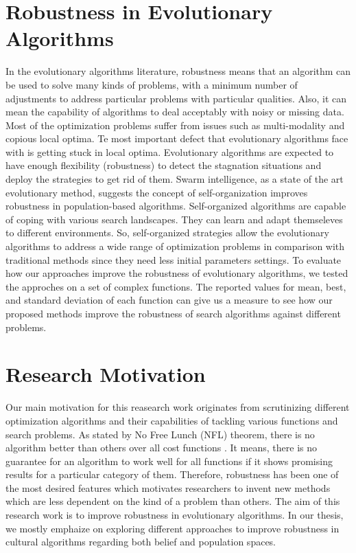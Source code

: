 \section{Robustness in Evolutionary Algorithms}
In the evolutionary algorithms literature, robustness means that an algorithm can be used to solve many kinds of problems, with a minimum number of adjustments to address particular problems with particular qualities. Also, it can mean the capability of algorithms to deal acceptably with noisy or missing data. Most of the optimization problems suffer from issues such as multi-modality and copious local optima. Te most important defect that evolutionary algorithms face with is getting stuck in local optima. Evolutionary algorithms are expected to have enough flexibility (robustness) to detect the stagnation situations and deploy the strategies to get rid of them.\newline
Swarm intelligence, as a state of the art evolutionary method, suggests the concept of self-organization improves robustness in population-based algorithms. Self-organized algorithms are capable of coping with various search landscapes. They can learn and adapt themseleves to different environments. So, self-organized strategies allow the evolutionary algorithms to address a wide range of optimization problems in comparison with traditional methods since they need less initial parameters settings. \newline
To evaluate how our approaches improve the robustness of evolutionary algorithms, we tested the approches on a set of complex functions. The reported values for mean, best, and standard deviation of each function can give us a measure to see how our proposed methods improve the robustness of search algorithms against different problems.
\section{Research Motivation}
Our main motivation for this reasearch work originates from scrutinizing different optimization algorithms and their capabilities of tackling various functions and search problems. As stated by No Free Lunch (NFL) theorem, there is no algorithm better than others over all cost functions \cite{wolpert1997no}. It means, there is no guarantee for an algorithm to work well for all functions if it shows promising results for a particular category of them. Therefore, robustness has been one of the most desired features which motivates researchers to invent new methods which are less dependent on the kind of a problem than others. The aim of this research work is to improve robustness in evolutionary algorithms. In our thesis, we mostly emphaize on exploring different approaches to improve robustness in cultural algorithms regarding both belief and population spaces.\newline
